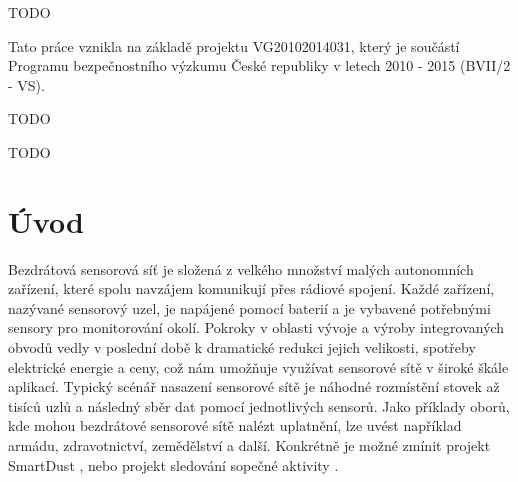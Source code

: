 \documentclass[11pt,final,twoside]{fithesis2}
\begin{document}
\FrontMatter
\ThesisTitlePage

\begin{ThesisDeclaration}
  \DeclarationText
  \AdvisorName
\end{ThesisDeclaration}

\begin{ThesisThanks}
TODO

Tato práce vznikla na základě projektu VG20102014031, který je součástí
Programu bezpečnostního výzkumu České republiky v letech 2010 - 2015
(BVII/2 - VS).
\end{ThesisThanks}

\begin{ThesisAbstract}
TODO
\end{ThesisAbstract}

\begin{ThesisKeyWords}
TODO
\end{ThesisKeyWords}

\MainMatter

\tableofcontents

\chapter{Úvod}
Bezdrátová sensorová síť je složená z velkého množství malých autonomních zařízení, které spolu navzájem komunikují přes rádiové spojení. Každé zařízení, nazývané sensorový uzel, je napájené pomocí
baterií a je vybavené potřebnými sensory pro monitorování okolí. Pokroky v oblasti vývoje a výroby integrovaných obvodů vedly v poslední době k dramatické redukci jejich velikosti, spotřeby elektrické 
energie a ceny, což nám umožňuje využívat sensorové sítě v široké škále aplikací. Typický scénář nasazení sensorové sítě je náhodné rozmístění stovek až tisíců uzlů a následný sběr dat pomocí jednotlivých 
sensorů. Jako příklady oborů, kde mohou bezdrátové sensorové sítě nalézt uplatnění, lze uvést například armádu, zdravotnictví, zemědělství a další. Konkrétně je možné zmínit projekt SmartDust 
\cite{Kahn1999}, nebo projekt sledování sopečné aktivity \cite{Werner-Allen2006}. 
\end{document}
